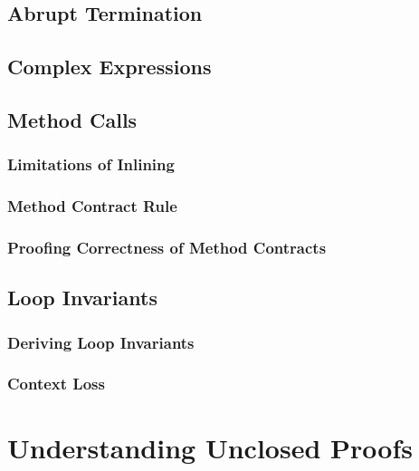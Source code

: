 \documentclass[a4paper, 11pt, accentcolor = tud3b]{tudreport}
\begin{document}
			\subsection{Abrupt Termination} %

			\subsection{Complex Expressions} %

			\subsection{Method Calls} %

				\subsubsection{Limitations of Inlining} %

				\subsubsection{Method Contract Rule} %

				\subsubsection{Proofing Correctness of Method Contracts} %

			\subsection{Loop Invariants} %

				\subsubsection{Deriving Loop Invariants} %

				\subsubsection{Context Loss} %

		\section{Understanding Unclosed Proofs} %
\end{document}
